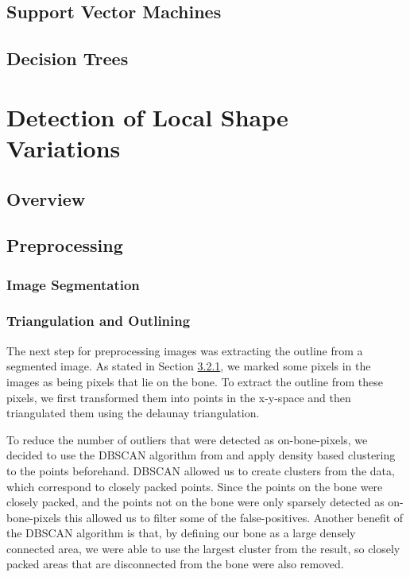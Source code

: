 \documentclass[pdftex,12pt,a4paper]{report}
\begin{document}
\section{Support Vector Machines}

\cite{pedregosa2011scikit}

\section{Decision Trees}

\chapter{Detection of Local Shape Variations}

\section{Overview}

\section{Preprocessing}

\subsection{Image Segmentation}
\label{sub:segmentation}

\cite{achanta2012slic}
\cite{felzenszwalb2004efficient}
\cite{houhou2009fast}
\cite{jain1990unsupervised}
\cite{haralick1973textural}

\subsection{Triangulation and Outlining}

The next step for preprocessing images was extracting the outline from a segmented image. As stated in Section
\ref{sub:segmentation}, we marked some pixels in the images as being pixels that lie on the bone.
To extract the outline from these pixels, we first transformed them into points in the x-y-space and then
triangulated them using the delaunay triangulation.

To reduce the number of outliers that were detected as on-bone-pixels,
we decided to use the DBSCAN algorithm from \cite{ester1996density} and apply density based clustering to the points
beforehand. DBSCAN allowed us to create clusters from the data, which correspond to closely packed points. Since
the points on the bone were closely packed, and the points not on the bone were only sparsely detected as
on-bone-pixels this allowed us to filter some of the false-positives. Another benefit of the DBSCAN algorithm is that,
by defining our bone as a large densely connected area, we were able to use the largest cluster from the result,
so closely packed areas that are disconnected from the bone were also removed.
\end{document}
